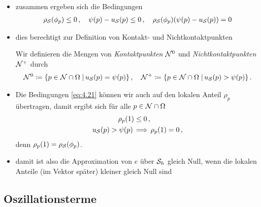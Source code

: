 \begin{itemize}
\item zusammen ergeben sich die Bedingungen
\begin{align}\label{eq:4.21}
	\rho_{\mathcal S} (\phi_p) \le 0 \, , \quad \psi(p)-u_{\mathcal S} (p) \le 0 \, , \quad \rho_{\mathcal S} (\phi_p) (\psi(p)-u_{\mathcal S} (p)) = 0
\end{align}

\item dies berechtigt zur Definition von Kontakt- und Nichtkontaktpunkten
\begin{defi}
Wir definieren die Mengen von \textit{Kontaktpunkten} $\mathcal N^0$ und \textit{Nichtkontaktpunkten} $\mathcal N^+$ durch
\begin{align*}
	\mathcal N^0 \coloneqq  \{p \in \mathcal N \cap \Omega \;\vert\, u_{\mathcal S}(p) = \psi (p) \} \, , \quad 
	\mathcal N^+ \coloneqq  \{p \in \mathcal N \cap \Omega \;\vert\, u_{\mathcal S}(p) > \psi (p) \}\, .
\end{align*}
\end{defi}

\item 
\begin{bem}
Die Bedingungen \eqref{eq:4.21} können wir auch auf den lokalen Anteil $\rho_p$ übertragen, damit ergibt sich für alle $p \in \mathcal N \cap \Omega$
\begin{subequations}\label{eq:4.22}
\begin{align}\label{eq:4.22a}
	\rho_p(1) &  \le 0\, ,  \\
	\label{eq:4.22b}
	u_{\mathcal S} (p) > \psi (p) \, & \Longrightarrow \, \rho_p(1) =0 \, ,
\end{align}
\end{subequations}
denn $\rho_p (1) = \rho_{\mathcal S} (\phi_p)$.
\end{bem}

\item damit ist also die Approximation von $e$ über $\mathcal S_h$ gleich Null, wenn die lokalen Anteile (im Vektor später) kleiner gleich Null sind

\end{itemize}






\subsection{Oszillationsterme}
\label{kap:4.1.3}

